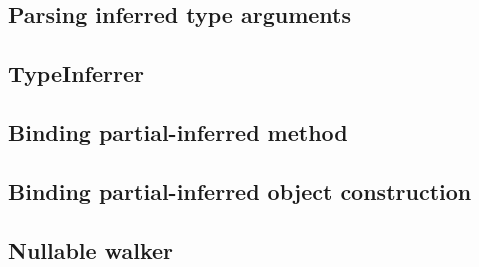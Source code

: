 \subsection{Parsing inferred type arguments}


\subsection{TypeInferrer}


\subsection{Binding partial-inferred method}


\subsection{Binding partial-inferred object construction}


\subsection{Nullable walker}

